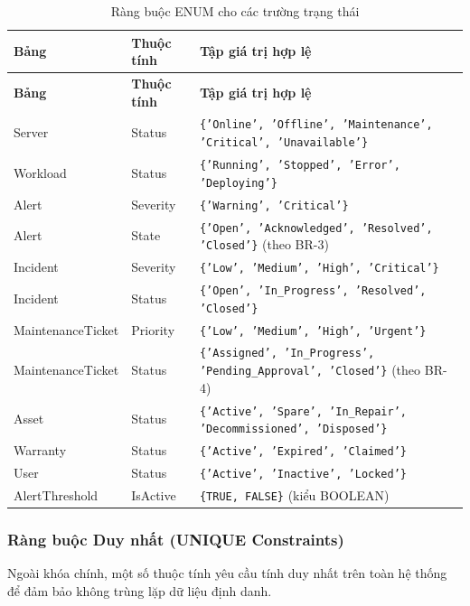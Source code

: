 \begin{longtable}{|l|l|p{7.5cm}|}
\caption{Ràng buộc ENUM cho các trường trạng thái} \label{tab:check_enum} \\
\hline
\textbf{Bảng} & \textbf{Thuộc tính} & \textbf{Tập giá trị hợp lệ} \\ \hline
\endfirsthead
\hline
\textbf{Bảng} & \textbf{Thuộc tính} & \textbf{Tập giá trị hợp lệ} \\ \hline
\endhead
\hline
\endfoot
Server & Status & \texttt{\{'Online', 'Offline', 'Maintenance', 'Critical', 'Unavailable'\}} \\ \hline
Workload & Status & \texttt{\{'Running', 'Stopped', 'Error', 'Deploying'\}} \\ \hline
Alert & Severity & \texttt{\{'Warning', 'Critical'\}} \\ \hline
Alert & State & \texttt{\{'Open', 'Acknowledged', 'Resolved', 'Closed'\}} (theo BR-3) \\ \hline
Incident & Severity & \texttt{\{'Low', 'Medium', 'High', 'Critical'\}} \\ \hline
Incident & Status & \texttt{\{'Open', 'In\_Progress', 'Resolved', 'Closed'\}} \\ \hline
MaintenanceTicket & Priority & \texttt{\{'Low', 'Medium', 'High', 'Urgent'\}} \\ \hline
MaintenanceTicket & Status & \texttt{\{'Assigned', 'In\_Progress', 'Pending\_Approval', 'Closed'\}} (theo BR-4) \\ \hline
Asset & Status & \texttt{\{'Active', 'Spare', 'In\_Repair', 'Decommissioned', 'Disposed'\}} \\ \hline
Warranty & Status & \texttt{\{'Active', 'Expired', 'Claimed'\}} \\ \hline
User & Status & \texttt{\{'Active', 'Inactive', 'Locked'\}} \\ \hline
AlertThreshold & IsActive & \texttt{\{TRUE, FALSE\}} (kiểu BOOLEAN) \\ \hline
\end{longtable}

\subsubsection{Ràng buộc Duy nhất (UNIQUE Constraints)}

Ngoài khóa chính, một số thuộc tính yêu cầu tính duy nhất trên toàn hệ thống để đảm bảo không trùng lặp dữ liệu định danh.

